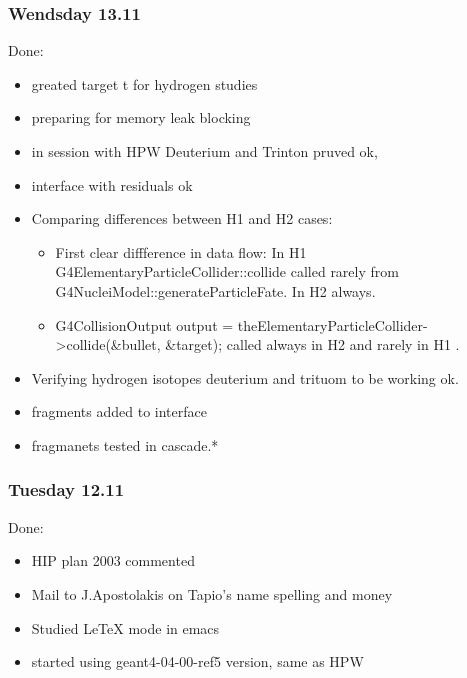 \subsubsection{Wendsday 13.11}

Done:

\begin{itemize}

\item greated target t for hydrogen studies

\item preparing for memory leak blocking

\item in session with HPW Deuterium and Trinton pruved ok,

\item interface with residuals ok

\item Comparing differences between H1 and H2 cases:

\begin{itemize}

\item First clear diffference in data flow: In H1
  G4ElementaryParticleCollider::collide called rarely from
  G4NucleiModel::generateParticleFate. In H2 always.

\item G4CollisionOutput output =
  theElementaryParticleCollider->collide(\&bullet, \&target); 
called always in H2 and rarely in H1 .

\end{itemize}

\item Verifying hydrogen isotopes deuterium and trituom to be working
  ok.

\item fragments added to interface

\item fragmanets tested in cascade.*

\end{itemize}


\subsubsection{Tuesday 12.11}

Done:

\begin{itemize}

\item HIP plan 2003 commented

\item Mail to J.Apostolakis on Tapio's name spelling and money

\item Studied LeTeX mode in emacs

\item started using geant4-04-00-ref5 version, 
same as HPW

\end{itemize}


